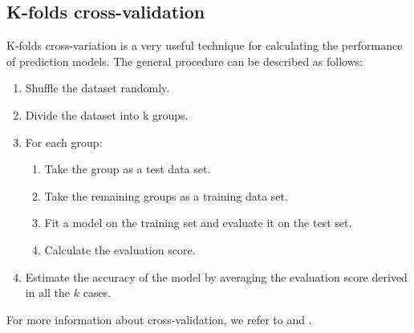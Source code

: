 \documentclass [11pt]{article}
\begin{document}
\subsection{K-folds cross-validation}
\label{sec_kcross}
K-folds cross-variation is a very useful technique for calculating the performance of prediction models. The general procedure can be described as follows:
\begin{enumerate}
\item Shuffle the dataset randomly.
\item Divide the dataset into k groups.
\item For each group:
\begin{enumerate}
\item Take the group as a test data set.
\item Take the remaining groups as a training data set.
\item Fit a model on the training set and evaluate it on the test set.
\item Calculate the evaluation score.
\end{enumerate}
\item Estimate the accuracy of the model by averaging the evaluation score derived in all the $k$ cases.
\end{enumerate}
For more information about cross-validation, we refer to \cite{TRJ} and \cite{2018arXiv180308823M}.
\end{document}
